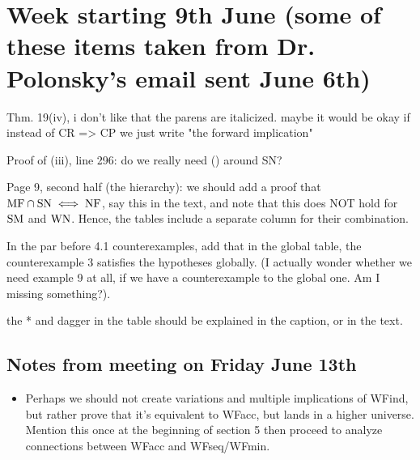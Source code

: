 \documentclass{article}
\newcommand{\cmark}{\ding{51}}%
\newcommand{\done}{\rlap{$\square$}{\raisebox{2pt}{\large\hspace{1pt}\cmark}}%
\hspace{-2.5pt}}
\begin{document}
\section*{Week starting 9th June (some of these items taken from Dr. Polonsky's email sent June 6th)}
\begin{todolist}
  \item [\done] Thm. 19(iv), i don't like that the parens are italicized.  maybe it would be okay if instead of CR => CP we just write "the forward implication"
  \item [\done] Proof of (iii), line 296: do we really need () around SN?
  \item [\done] Page 9, second half (the hierarchy): we should add a proof that $\mathrm{MF} \cap \mathrm{SN} \iff \mathrm{NF}$, say this in the text, and note that this does NOT hold for $\mathrm{SM}$ and $\mathrm{WN}$.  Hence, the tables include a separate column for their combination.
  \item [\done] In the par before 4.1 counterexamples, add that in the global table, the counterexample 3 satisfies the hypotheses globally.
(I actually wonder whether we need example 9 at all, if we have a counterexample to the global one.  Am I missing something?). 
    \item [\done] the * and dagger in the table should be explained in the caption, or in the text.
\end{todolist}

\subsection*{Notes from meeting on Friday June 13th}

\begin{itemize}
  \item Perhaps we should not create variations and multiple implications of WFind,
  but rather prove that it's equivalent to WFacc, but lands in a higher universe.
  Mention this once at the beginning of section 5 then proceed to analyze
  connections between WFacc and WFseq/WFmin.
\end{itemize}
\end{document}
